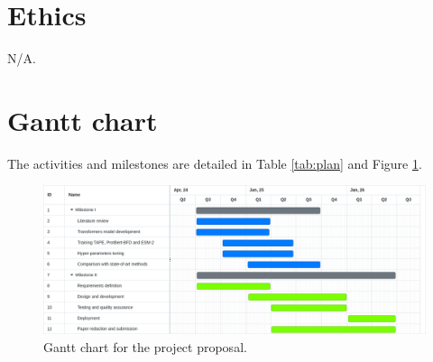 \documentclass[a4paper,11pt]{article}
\begin{document}
\section{Ethics}
N/A.

\section{Gantt chart}

The activities and milestones are detailed in Table \ref{tab:plan} and Figure \ref{fig:gantt}.

\begin{figure}[h]
	\centering	
	\includegraphics[width=\textwidth]{img/neoantigen/gantt}
	\caption{Gantt chart for the project proposal.}
	\label{fig:gantt}
	
\end{figure}
	
	


	
	
	
	
\end{document}
